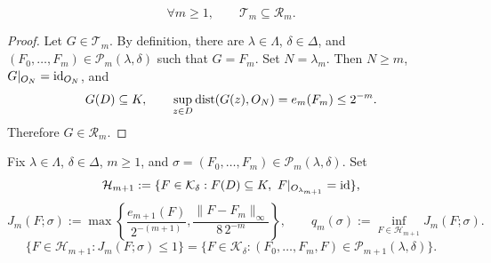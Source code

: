 \begin{lemma}
\label{lem:last-maps-in-R}
\[
 \forall m\ge1,\qquad \mathcal T_m\subseteq\mathcal R_m.
\]
\end{lemma}
\begin{proof}
Let \(G\in\mathcal T_m\). By definition, there are
\(\lambda\in\Lambda\), \(\delta\in\Delta\), and
\((F_0,\ldots,F_m)\in\mathcal P_m(\lambda,\delta)\) such that
\(G=F_m\). Set \(N=\lambda_m\). Then \(N\ge m\),
\(G|_{O_N}=\operatorname{id}_{O_N}\), and
\[
 G(D)\subseteq K,\qquad
 \sup_{z\in D}\operatorname{dist}(G(z),O_N)=e_m(F_m)\le2^{-m}.
\]
Therefore \(G\in\mathcal R_m\).
\end{proof}

\begin{definition}
\label{def:extension-functional}
Fix \(\lambda\in\Lambda\), \(\delta\in\Delta\), \(m\ge1\), and
\(\sigma=(F_0,\ldots,F_m)\in\mathcal P_m(\lambda,\delta)\). Set
\[
 \mathcal H_{m+1}:=
 \{F\in\mathcal K_\delta:F(D)\subseteq K,\
                    F|_{O_{\lambda_{m+1}}}=\operatorname{id}\},
\]
\[
 J_m(F;\sigma):=
 \max\left\{
 \frac{e_{m+1}(F)}{2^{-(m+1)}},
 \frac{\|F-F_m\|_\infty}{8\,2^{-m}}
 \right\},\qquad
 q_m(\sigma):=\inf_{F\in\mathcal H_{m+1}}J_m(F;\sigma).
\]
\[
 \{F\in\mathcal H_{m+1}:J_m(F;\sigma)\le1\}
 =
 \{F\in\mathcal K_\delta:
   (F_0,\ldots,F_m,F)\in\mathcal P_{m+1}(\lambda,\delta)\}.
\]
\end{definition}

